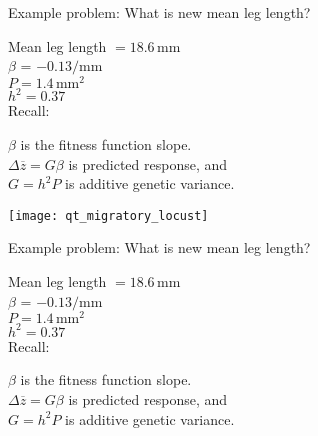 \documentclass[t]{beamer}
\begin{document}

\begin{frame}[t]{Example problem: What is new mean leg length?}
\vspace{-0.5\baselineskip}
\begin{multicols}{2}

\noindent Mean leg length $= 18.6\,\mathrm{mm}$\\[1ex]
$\beta$ = $-0.13/\mathrm{mm}$ \\[1ex]
$P = 1.4\,\mathrm{mm}^2$ \\[1ex]
$h^2 = 0.37$\\[1ex]

\vspace{\baselineskip}
Recall:

$\beta$ is the fitness function slope.\\[1ex]
$\Delta\overline{z} = G\beta$ is predicted response, and\\[1ex]
$G = h^2P$ is additive genetic variance.\\

\columnbreak

\centering
\noindent\texttt{[image: qt\_migratory\_locust]}

\end{multicols}

\vfilll

\end{frame}


\begin{frame}[t]{Example problem: What is new mean leg length?}
\vspace{-0.5\baselineskip}
\begin{multicols}{2}

Mean leg length $= 18.6\,\mathrm{mm}$\\[1ex]
$\beta$ = $-0.13/\mathrm{mm}$ \\[1ex]
$P = 1.4\,\mathrm{mm}^2$ \\[1ex]
$h^2 = 0.37$\\[1ex]

\vspace{\baselineskip}
Recall:

$\beta$ is the fitness function slope.\\[1ex]
$\Delta\overline{z} = G\beta$ is predicted response, and\\[1ex]
$G = h^2P$ is additive genetic variance.\\

\columnbreak


\end{multicols}
\end{frame}
\end{document}
